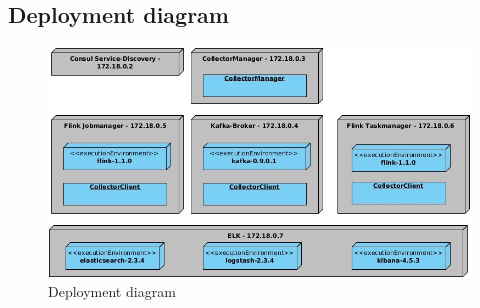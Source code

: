 


\subsection{Deployment diagram}
\begin{figure}[H]
	\centering
	\includegraphics[width=1.0\textwidth]{../uml/deployment-diagram.jpg}
	\caption{Deployment diagram}
	\label{deployment-diagram}
\end{figure}


